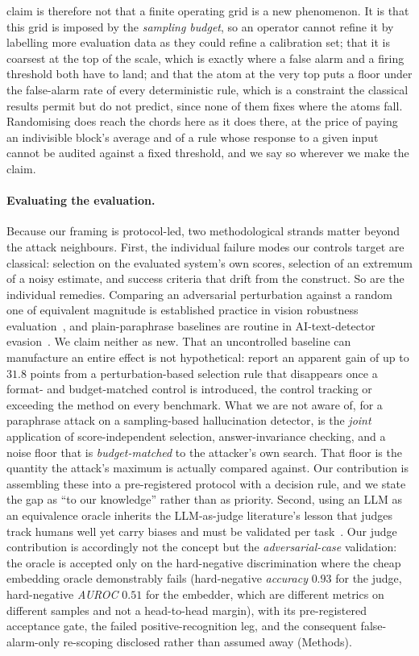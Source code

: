 claim is therefore not that a finite operating grid is a new phenomenon. It is that this grid
is imposed by the \emph{sampling budget}, so an operator cannot refine it by labelling more
evaluation data as they could refine a calibration set; that it is coarsest at the top of the
scale, which is exactly where a false alarm and a firing threshold both have to land; and that
the atom at the very top puts a floor under the false-alarm rate of every deterministic rule,
which is a constraint the classical results permit but do not predict, since none of them fixes
where the atoms fall. Randomising does reach the chords here as it does there, at the price of
paying an indivisible block's average and of a rule whose response to a given input cannot be
audited against a fixed threshold, and we say so wherever we make the claim.

\paragraph{Evaluating the evaluation.}
Because our framing is protocol-led, two methodological strands matter beyond the attack
neighbours. First, the individual failure modes our controls target are classical:
selection on the evaluated system's own scores, selection of an extremum of a noisy
estimate, and success criteria that drift from the construct. So are the individual
remedies. Comparing an adversarial perturbation against a random one of equivalent
magnitude is established practice in vision robustness
evaluation~\citep{rossolini2026worstcase}, and plain-paraphrase baselines are routine in
AI-text-detector evasion~\citep{cheng2025advparaphrasing}. We claim neither as new. That an
uncontrolled baseline can manufacture an entire effect is not hypothetical:
\citet{zheng2026matchedctrl} report an apparent gain of up to $31.8$ points from a
perturbation-based selection rule that disappears once a format- and budget-matched control
is introduced, the control tracking or exceeding the method on every benchmark. What we
are not aware of, for a paraphrase attack on a sampling-based hallucination detector, is
the \emph{joint} application of score-independent selection, answer-invariance checking,
and a noise floor that is \emph{budget-matched} to the attacker's own search. That floor is
the quantity the attack's maximum is actually compared against. Our contribution is
assembling these into a pre-registered protocol with a decision rule, and we state the gap
as ``to our knowledge'' rather than as priority.
Second, using an LLM as an equivalence oracle inherits the LLM-as-judge literature's
lesson that judges track humans well yet carry biases and must be validated per
task~\citep{zheng2023judging}. Our judge contribution is accordingly not the concept but
the \emph{adversarial-case} validation: the oracle is accepted only on the hard-negative
discrimination where the cheap embedding oracle demonstrably fails (hard-negative
\emph{accuracy} $0.93$ for the judge, hard-negative \emph{AUROC} $0.51$ for the embedder,
which are different metrics on different samples and not a head-to-head margin),
with its pre-registered acceptance gate, the failed positive-recognition leg, and the
consequent false-alarm-only re-scoping disclosed rather than assumed away (Methods).
